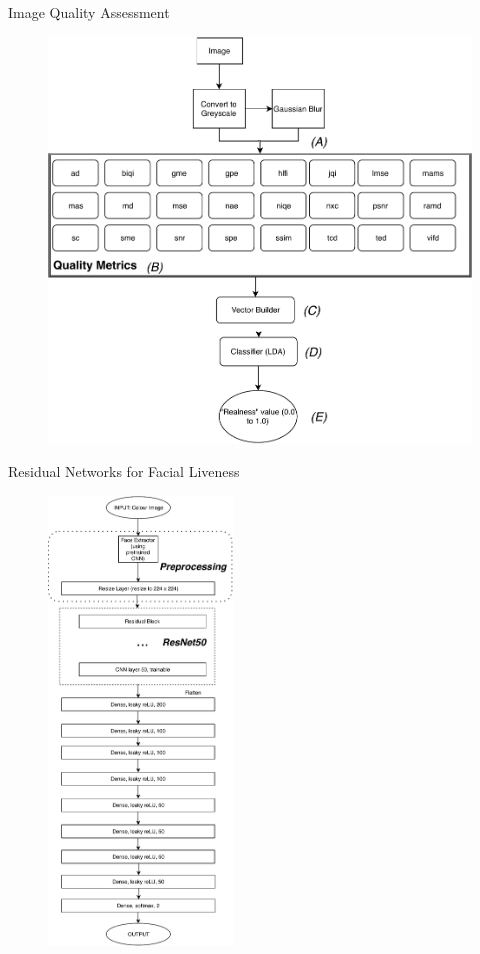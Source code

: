 \documentclass[final]{beamer}
\begin{document}
\begin{frame}{}
\begin{columns}[t]
\begin{column}{.48\linewidth}
        \begin{block}{Image Quality Assessment}
          \begin{figure}
            \includegraphics[width=.5\linewidth]{ImageQualityLivenessTest.pdf}
          \end{figure}
    
        \end{block}
       
        \begin{block}{Residual Networks for Facial Liveness}
          

          \begin{figure}
            \includegraphics[height=450px]{2DCNNArchitecture.pdf}
          \end{figure}
    
        \end{block}


\end{column}
\end{columns}
\end{frame}
\end{document}
